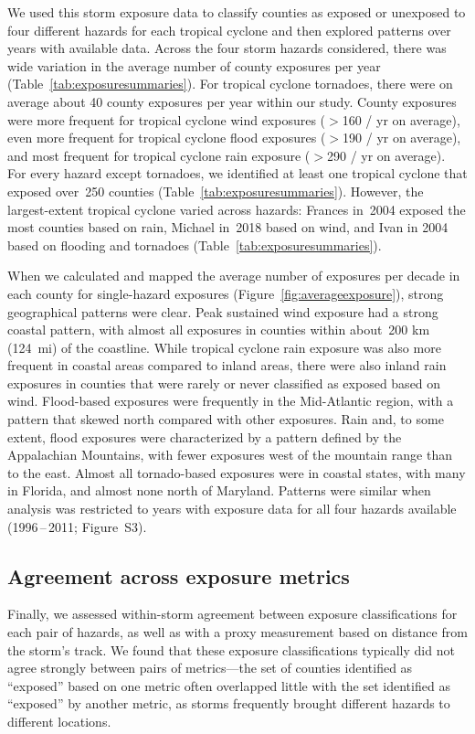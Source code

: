 We used this storm exposure data to classify counties as exposed or unexposed
to four different hazards for each tropical cyclone and then explored patterns
over years with available data. Across the four storm hazards considered, there
was wide variation in the average number of county exposures per year
(Table~\ref{tab:exposuresummaries}). For tropical cyclone tornadoes,
there were on average about 40 county exposures per year within our study.
County exposures were more frequent for tropical cyclone wind exposures ($>$160
/ yr on average), even more frequent for tropical cyclone flood exposures
($>$190 / yr on average), and most frequent for tropical cyclone rain exposure
($>$290 / yr on average). For every hazard except tornadoes, we identified at
least one tropical cyclone that exposed over~250 counties
(Table~\ref{tab:exposuresummaries}).  However, the largest-extent tropical
cyclone varied across hazards: Frances in~2004 exposed the most counties based
on rain, Michael in~2018 based on wind, and Ivan in 2004 based on flooding and
tornadoes (Table~\ref{tab:exposuresummaries}).

When we calculated and mapped the average number of exposures per decade in
each county for single-hazard exposures (Figure~\ref{fig:averageexposure}),
strong geographical patterns were clear. Peak sustained wind exposure had a
strong coastal pattern, with almost all exposures in counties within about~200
\si{\kilo\metre} (124~mi) of the coastline. While tropical cyclone rain
exposure was also more frequent in coastal areas compared to inland areas,
there were also inland rain exposures in counties that were rarely or never
classified as exposed based on wind. Flood-based exposures were frequently in
the Mid-Atlantic region, with a pattern that skewed north compared with other
exposures. Rain and, to some extent, flood exposures were characterized by a
pattern defined by the Appalachian Mountains, with fewer exposures west of the
mountain range than to the east. Almost all tornado-based exposures were in
coastal states, with many in Florida, and almost none north of Maryland.
Patterns were similar when analysis was restricted to years with exposure data
for all four hazards available (1996\,--\,2011; Figure~S3). 

\subsection*{Agreement across exposure metrics}

Finally, we assessed within-storm agreement between exposure classifications
for each pair of hazards, as well as with a proxy measurement based on distance
from the storm's track. We found that these exposure classifications typically
did not agree strongly between pairs of metrics---the set of counties
identified as ``exposed'' based on one metric often overlapped little with the
set identified as ``exposed'' by another metric, as storms frequently brought
different hazards to different locations. 

